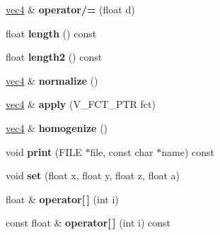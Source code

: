 \begin{DoxyCompactItemize}
\item 
\hypertarget{classvec4_a0fef5587e25bbb396685e410820f80a5}{\hyperlink{classvec4}{vec4} \& {\bfseries operator/=} (float d)}\label{classvec4_a0fef5587e25bbb396685e410820f80a5}

\item 
\hypertarget{classvec4_aa1c5dd86c8fbde45d6b6beabe45487e2}{float {\bfseries length} () const }\label{classvec4_aa1c5dd86c8fbde45d6b6beabe45487e2}

\item 
\hypertarget{classvec4_a0b43d50e90a42fd019f57d85ef7c3966}{float {\bfseries length2} () const }\label{classvec4_a0b43d50e90a42fd019f57d85ef7c3966}

\item 
\hypertarget{classvec4_a13ccaff64d17779921fabd9d65396a4b}{\hyperlink{classvec4}{vec4} \& {\bfseries normalize} ()}\label{classvec4_a13ccaff64d17779921fabd9d65396a4b}

\item 
\hypertarget{classvec4_ae4787582447129f06bded51177bc07a6}{\hyperlink{classvec4}{vec4} \& {\bfseries apply} (V\-\_\-\-F\-C\-T\-\_\-\-P\-T\-R fct)}\label{classvec4_ae4787582447129f06bded51177bc07a6}

\item 
\hypertarget{classvec4_af44a87b94fd71ec7d78643e81124faf5}{\hyperlink{classvec4}{vec4} \& {\bfseries homogenize} ()}\label{classvec4_af44a87b94fd71ec7d78643e81124faf5}

\item 
\hypertarget{classvec4_a47d22c2d3f88febd80522bea183cee53}{void {\bfseries print} (F\-I\-L\-E $\ast$file, const char $\ast$name) const }\label{classvec4_a47d22c2d3f88febd80522bea183cee53}

\item 
\hypertarget{classvec4_a858b6b49f7476e4079d7e8d8becb2e03}{void {\bfseries set} (float x, float y, float z, float a)}\label{classvec4_a858b6b49f7476e4079d7e8d8becb2e03}

\item 
\hypertarget{classvec4_a2fbcfeb37dd07ace177c61b7caa9c4fa}{float \& {\bfseries operator\mbox{[}$\,$\mbox{]}} (int i)}\label{classvec4_a2fbcfeb37dd07ace177c61b7caa9c4fa}

\item 
\hypertarget{classvec4_a8ff3a10e2e76c7fe7cb827c7094481aa}{const float \& {\bfseries operator\mbox{[}$\,$\mbox{]}} (int i) const }\label{classvec4_a8ff3a10e2e76c7fe7cb827c7094481aa}

\end{DoxyCompactItemize}
